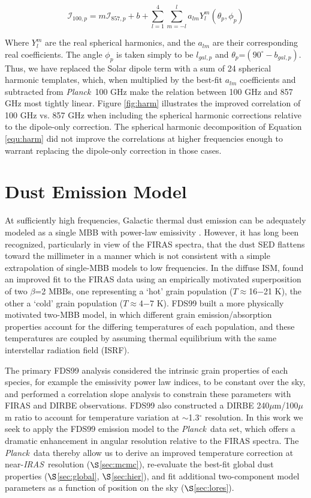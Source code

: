\documentclass{emulateapj}
\newcommand{\IRAS}{{\it IRAS}}
\newcommand{\PLANCK}{{\it Planck}}
\begin{document}
\begin{equation} \label{equ:harm}
\mathcal{I}_{100, p} = m\mathcal{I}_{857, p} + b + \sum_{l=1}^{4} \sum_{m=-l}^{l} a_{lm}Y_{l}^{m}(\theta_p, \phi_p)
\end{equation}

Where $Y_{l}^{m}$ are the real spherical harmonics, and the $a_{lm}$ are their 
corresponding real coefficients. The angle $\phi_p$ is taken simply to be 
$l_{gal, p}$ and $\theta_p$=$(90^{\circ}-b_{gal, p})$. Thus, we have replaced 
the Solar dipole term with a sum of 24 spherical harmonic templates, which, 
when multiplied by the best-fit $a_{lm}$ coefficients and subtracted from 
\PLANCK~100 GHz make the relation between 100 GHz and 857 GHz most tightly 
linear. Figure \ref{fig:harm} illustrates the improved correlation of 100 GHz 
vs. 857 GHz when including the spherical harmonic corrections relative to the 
dipole-only correction. The spherical harmonic decomposition of Equation 
\ref{equ:harm} did not improve the correlations at higher frequencies 
enough to warrant replacing the dipole-only correction in those cases.

\section{Dust Emission Model}
\label{sec:modeling}

At sufficiently high frequencies, Galactic thermal dust emission can be 
adequately modeled as a single MBB with power-law emissivity 
\citep[e.g. SFD;][]{planckdust}. However, it has long been recognized, 
particularly in view of the FIRAS spectra, that the dust SED flattens toward 
the millimeter in a manner which is not consistent with a simple extrapolation 
of single-MBB models to low frequencies. In the diffuse ISM, \cite{reach95} 
found an improved fit to the FIRAS data using an empirically motivated 
superposition of two $\beta$=2 MBBs, one representing a `hot' grain population 
($T$$\approx$16$-$21 K), the other a `cold' grain population 
($T$$\approx$4$-$7 K). FDS99 built a more physically motivated two-MBB model, 
in which different grain emission/absorption properties account for the 
differing temperatures of each population, and these temperatures are coupled 
by assuming thermal equilibrium with the same interstellar radiation field 
(ISRF).

The primary FDS99 analysis considered the intrinsic grain properties of each
species, for example the emissivity power law indices, to be constant over the 
sky, and performed a correlation slope analysis to constrain these parameters 
with FIRAS and DIRBE observations. FDS99 also constructed a DIRBE 
240$\mu$m/100$\mu$m ratio to account for temperature variation at 
$\sim$1.3$^{\circ}$ resolution. In this work we seek to apply the FDS99 
emission model to the \PLANCK~data set, which offers a dramatic enhancement in
angular resolution relative to the FIRAS spectra. The \PLANCK~data thereby 
allow us to derive an improved temperature correction at near-\IRAS~resolution
($\S$\ref{sec:mcmc}), re-evaluate the best-fit global dust properties 
($\S$\ref{sec:global}, $\S$\ref{sec:hier}), and fit additional 
two-component model parameters as a function of position on the sky 
($\S$\ref{sec:lores}).
\end{document}
